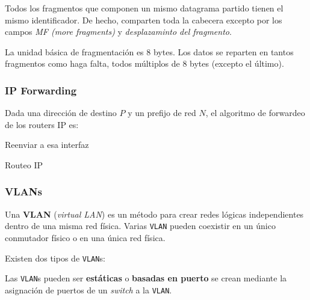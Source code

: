 \documentclass[]{article}
\begin{document}
Todos los fragmentos que componen un mismo datagrama partido tienen el mismo identificador. De hecho, comparten toda la cabecera excepto por los campos \emph{MF (more fragments)} y \emph{desplazaminto del fragmento}.

La unidad básica de fragmentación es 8 bytes. Los datos se reparten en tantos fragmentos como haga falta, todos múltiplos de 8 bytes (excepto el último).


\subsubsection{IP Forwarding}
Dada una dirección de destino $P$ y un prefijo de red $N$, el algoritmo de forwardeo de los routers IP es:

\begin{algorithm}[H]
  {
    Reenviar a esa interfaz
 } {
 }
 \caption{Routeo IP}
\end{algorithm}

\subsubsection{VLANs}


Una \textbf{VLAN} (\emph{virtual LAN}) es un método para crear redes lógicas independientes dentro de una misma red física. Varias \texttt{VLAN} pueden coexistir en un único conmutador físico o en una única red física.

Existen dos tipos de \texttt{VLAN}s:

Las \texttt{VLAN}s pueden ser \textbf{estáticas} o \textbf{basadas en puerto} se crean mediante la asignación de puertos de un \emph{switch} a la \texttt{VLAN}.
\end{document}
